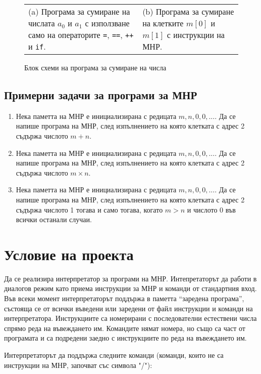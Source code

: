 \documentclass[12pt,a4paper]{article}
\newcommand{\code}[1]{\texttt{#1}}
\begin{document}
{\begin{figure}
\begin{tabular}{p{7cm} p{7cm}}
      \\
      (a) Програма за сумиране на числата $a_0$ и $a_1$ с използване само на операторите \code{=}, \code{==}, \code{++} и \code{if}.
      &
      (b) Програма за сумиране на клетките $m[0]$ и $m[1]$ с инструкции на МНР.
  \end{tabular}

  \caption{Блок схеми на програма за сумиране на числа}
  \label{fig:mnr}
\end{figure}

\subsection{Примерни задачи за програми за МНР}


\begin{enumerate}[resume]
	\item Нека паметта на МНР е инициализирана с редицата $m,n,0,0,...$. Да се напише програма на МНР, след изпълнението на която клетката с адрес 2 съдържа числото $m+n$.
	\item Нека паметта на МНР е инициализирана с редицата $m,n,0,0,...$. Да се напише програма на МНР, след изпълнението на която клетката с адрес 2 съдържа числото $m \times n$.
	\item Нека паметта на МНР е инициализирана с редицата $m,n,0,0,...$. Да се напише програма на МНР, след изпълнението на която клетката с адрес 2 съдържа числото 1 тогава и само тогава, когато $m>n$ и числото 0 във всички останали случаи.
\end{enumerate}

\section{Условие на проекта}

Да се реализира интерпретатор за програми на МНР. Интепретаторът да работи в диалогов режим като приема инструкции за МНР и команди от стандартния вход. Във всеки момент интерпретаторът поддържа в паметта ``заредена програма'', състояща се от всички въведени или заредени от файл инструкции и команди на интерпретатора. Инструкциите са номерирани с последователни естествени числа спрямо реда на въвеждането им. Командите нямат номера, но също са част от програмата и са подредени заедно с инструкциите по реда на въвеждането им.

Интерпретаторът да поддържа следните команди (команди, които не са инструкции на МНР, започват със символа "/"):

}
\end{document}
